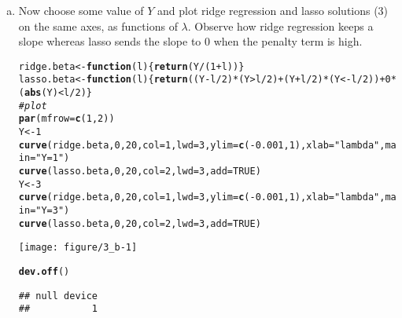 \documentclass[12pt]{article}\usepackage[]{graphicx}\usepackage[]{color}
\makeatletter
\def\maxwidth{ %
  \ifdim\Gin@nat@width>\linewidth
    \linewidth
  \else
    \Gin@nat@width
  \fi
}
\newcommand{\hlnum}[1]{\textcolor[rgb]{0.686,0.059,0.569}{#1}}%
\newcommand{\hlstr}[1]{\textcolor[rgb]{0.192,0.494,0.8}{#1}}%
\newcommand{\hlcom}[1]{\textcolor[rgb]{0.678,0.584,0.686}{\textit{#1}}}%
\newcommand{\hlopt}[1]{\textcolor[rgb]{0,0,0}{#1}}%
\newcommand{\hlstd}[1]{\textcolor[rgb]{0.345,0.345,0.345}{#1}}%
\newcommand{\hlkwa}[1]{\textcolor[rgb]{0.161,0.373,0.58}{\textbf{#1}}}%
\newcommand{\hlkwb}[1]{\textcolor[rgb]{0.69,0.353,0.396}{#1}}%
\newcommand{\hlkwc}[1]{\textcolor[rgb]{0.333,0.667,0.333}{#1}}%
\newcommand{\hlkwd}[1]{\textcolor[rgb]{0.737,0.353,0.396}{\textbf{#1}}}%
\newenvironment{kframe}{%
 \def\at@end@of@kframe{}%
 \ifinner\ifhmode%
  \def\at@end@of@kframe{\end{minipage}}%
  \begin{minipage}{\columnwidth}%
 \fi\fi%
 \def\FrameCommand##1{\hskip\@totalleftmargin \hskip-\fboxsep
 \colorbox{shadecolor}{##1}\hskip-\fboxsep
     \hskip-\linewidth \hskip-\@totalleftmargin \hskip\columnwidth}%
 \MakeFramed {\advance\hsize-\width
   \@totalleftmargin\z@ \linewidth\hsize
   \@setminipage}}%
 {\par\unskip\endMakeFramed%
 \at@end@of@kframe}
\newenvironment{knitrout}{}{} %
\theoremstyle{definition}
\makeatother
\begin{document}
\begin{enumerate}[1.]
\begin{enumerate}[(a)]
\begin{knitrout}
\end{knitrout}


      \item Now choose some value of $Y$ and plot ridge regression and lasso solutions (3) on the same axes, as functions of $\lambda$. Observe how ridge regression keeps a slope whereas lasso sends the slope to 0 when the penalty term is high.
\begin{knitrout}
\color{fgcolor}\begin{kframe}
\begin{alltt}
\hlstd{ridge.beta} \hlkwb{<-} \hlkwa{function}\hlstd{(}\hlkwc{l}\hlstd{)\{}\hlkwd{return}\hlstd{( Y}\hlopt{/}\hlstd{(}\hlnum{1}\hlopt{+}\hlstd{l) )\}}
\hlstd{lasso.beta} \hlkwb{<-} \hlkwa{function}\hlstd{(}\hlkwc{l}\hlstd{)\{} \hlkwd{return}\hlstd{( (Y}\hlopt{-}\hlstd{l}\hlopt{/}\hlnum{2}\hlstd{)}\hlopt{*}\hlstd{(Y} \hlopt{>} \hlstd{l}\hlopt{/}\hlnum{2}\hlstd{)} \hlopt{+} \hlstd{(Y}\hlopt{+}\hlstd{l}\hlopt{/}\hlnum{2}\hlstd{)}\hlopt{*}\hlstd{(Y} \hlopt{< -}\hlstd{l}\hlopt{/}\hlnum{2}\hlstd{))} \hlopt{+} \hlnum{0}\hlopt{*}\hlstd{(}\hlkwd{abs}\hlstd{(Y)} \hlopt{<} \hlstd{l}\hlopt{/}\hlnum{2}\hlstd{)\}}
\hlcom{# plot}
\hlkwd{par}\hlstd{(}\hlkwc{mfrow} \hlstd{=} \hlkwd{c}\hlstd{(}\hlnum{1}\hlstd{,}\hlnum{2}\hlstd{))}
\hlstd{Y} \hlkwb{<-} \hlnum{1}
\hlkwd{curve}\hlstd{( ridge.beta,} \hlnum{0}\hlstd{,} \hlnum{20}\hlstd{,} \hlkwc{col}\hlstd{=}\hlnum{1}\hlstd{,} \hlkwc{lwd}\hlstd{=}\hlnum{3}\hlstd{,} \hlkwc{ylim} \hlstd{=} \hlkwd{c}\hlstd{(}\hlopt{-}\hlnum{0.001}\hlstd{,}\hlnum{1}\hlstd{),} \hlkwc{xlab}\hlstd{=}\hlstr{"lambda"}\hlstd{,} \hlkwc{main}\hlstd{=}\hlstr{"Y=1"} \hlstd{)}
\hlkwd{curve}\hlstd{( lasso.beta,} \hlnum{0}\hlstd{,} \hlnum{20}\hlstd{,} \hlkwc{col}\hlstd{=}\hlnum{2}\hlstd{,} \hlkwc{lwd}\hlstd{=}\hlnum{3}\hlstd{,} \hlkwc{add}\hlstd{=}\hlnum{TRUE}\hlstd{)}
\hlstd{Y} \hlkwb{<-} \hlnum{3}
\hlkwd{curve}\hlstd{( ridge.beta,} \hlnum{0}\hlstd{,} \hlnum{20}\hlstd{,} \hlkwc{col}\hlstd{=}\hlnum{1}\hlstd{,} \hlkwc{lwd}\hlstd{=}\hlnum{3}\hlstd{,} \hlkwc{ylim} \hlstd{=} \hlkwd{c}\hlstd{(}\hlopt{-}\hlnum{0.001}\hlstd{,}\hlnum{1}\hlstd{),} \hlkwc{xlab}\hlstd{=}\hlstr{"lambda"}\hlstd{,} \hlkwc{main}\hlstd{=}\hlstr{"Y=3"} \hlstd{)}
\hlkwd{curve}\hlstd{( lasso.beta,} \hlnum{0}\hlstd{,} \hlnum{20}\hlstd{,} \hlkwc{col}\hlstd{=}\hlnum{2}\hlstd{,} \hlkwc{lwd}\hlstd{=}\hlnum{3}\hlstd{,} \hlkwc{add}\hlstd{=}\hlnum{TRUE}\hlstd{)}
\end{alltt}
\end{kframe}
\texttt{[image: figure/3\_b-1]} 
\begin{kframe}\begin{alltt}
\hlkwd{dev.off}\hlstd{()}
\end{alltt}
\begin{verbatim}
## null device 
##           1
\end{verbatim}
\end{kframe}
\end{knitrout}


\end{enumerate}
\end{enumerate}
\end{document}
